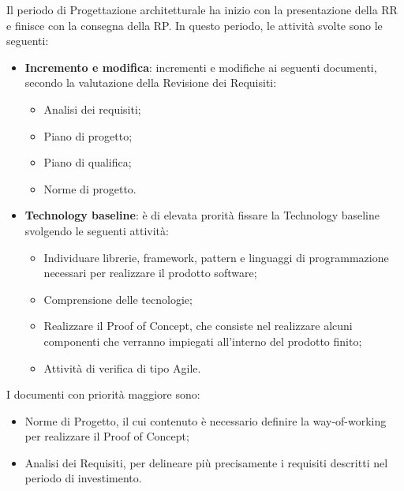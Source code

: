 Il periodo di Progettazione architetturale ha inizio con la presentazione della RR e finisce con la consegna della RP.\newline
In questo periodo, le attività svolte sono le seguenti:
\begin{itemize}
	\item \textbf{Incremento e modifica}: incrementi e modifiche ai seguenti documenti, secondo la valutazione della Revisione dei Requisiti:
	\begin{itemize}
		\item Analisi dei requisiti;
		\item Piano di progetto;
		\item Piano di qualifica;
		\item Norme di progetto.
	\end{itemize}
	\item \textbf{Technology baseline}: è di elevata prorità fissare la Technology baseline svolgendo le seguenti attività:
	\begin{itemize}
		\item Individuare librerie, framework, pattern e linguaggi di programmazione necessari per realizzare il prodotto software;
		\item Comprensione delle tecnologie;
		\item Realizzare il Proof of Concept, che consiste nel realizzare alcuni componenti che verranno impiegati all'interno del prodotto finito;
		\item Attività di verifica di tipo {Agile}.
	\end{itemize}
	
\end{itemize}
I documenti con priorità maggiore sono: 
	\begin{itemize}
		\item Norme di Progetto, il cui contenuto è necessario definire la 
			{way-of-working} per realizzare il {Proof of Concept};
		\item Analisi dei Requisiti, per delineare più 
			precisamente i requisiti descritti nel periodo di investimento.
	\end{itemize}
 
